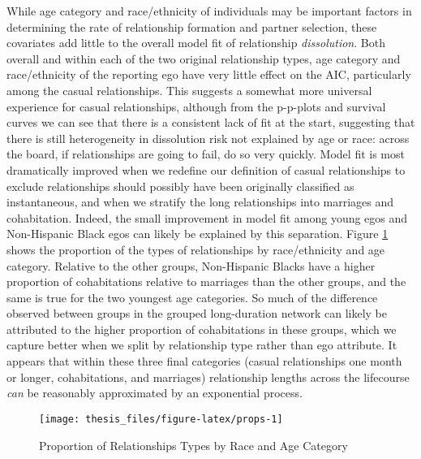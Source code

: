\documentclass [11pt, proquest] {uwthesis}[2015/03/03]
\begin{document}
While age category and race/ethnicity of individuals may be important factors in determining the rate of relationship formation and partner selection, these covariates add little to the overall model fit of relationship \emph{dissolution}. Both overall and within each of the two original relationship types, age category and race/ethnicity of the reporting ego have very little effect on the AIC, particularly among the casual relationships. This suggests a somewhat more universal experience for casual relationships, although from the p-p-plots and survival curves we can see that there is a consistent lack of fit at the start, suggesting that there is still heterogeneity in dissolution risk not explained by age or race: across the board, if relationships are going to fail, do so very quickly. Model fit is most dramatically improved when we redefine our definition of casual relationships to exclude relationships should possibly have been originally classified as instantaneous, and when we stratify the long relationships into marriages and cohabitation. Indeed, the small improvement in model fit among young egos and Non-Hispanic Black egos can likely be explained by this separation. Figure \ref{fig:props} shows the proportion of the types of relationships by race/ethnicity and age category. Relative to the other groups, Non-Hispanic Blacks have a higher proportion of cohabitations relative to marriages than the other groups, and the same is true for the two youngest age categories. So much of the difference observed between groups in the grouped long-duration network can likely be attributed to the higher proportion of cohabitations in these groups, which we capture better when we split by relationship type rather than ego attribute. It appears that within these three final categories (casual relationships one month or longer, cohabitations, and marriages) relationship lengths across the lifecourse \emph{can} be reasonably approximated by an exponential process.\\
\begin{figure}

{\centering \texttt{[image: thesis\_files/figure-latex/props-1]} 

}

\caption{Proportion of Relationships Types by Race and Age Category}\label{fig:props}
\end{figure}
\end{document}
